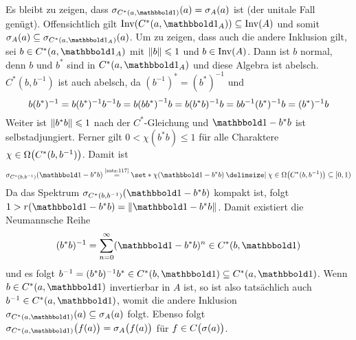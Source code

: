 \begin{beweis}
	Es bleibt zu zeigen, dass $\sigma_{C^*(a,\ind)}(a)= \sigma_A(a)$ ist (der unitale Fall genügt). 
	Offensichtlich gilt $\Inv \enbrace*{C^*(a,\ind_A)} \subseteq  \Inv(A)$ und somit $\sigma_A(a) \subseteq \sigma_{C^*(a,\ind_A)}(a)$. 
	Um zu zeigen, dass auch die andere Inklusion gilt, sei $b \in C^*(a,\ind_A)$ mit $\norm*{b}\le 1$ und $b \in \Inv(A)$.
	Dann ist $b$ normal, denn $b$ und $b^*$ sind in $C^*(a,\ind_A)$ und diese Algebra ist abelsch.
	$C^*(b,b^{-1})$ ist auch abelsch, da $(b^{-1})^* = (b^*)^{-1}$ und  
	\[
		b(b^*)^{-1} = b(b^*)^{-1} b^{-1} b = b \enbrace*{bb^*}^{-1} b = b(b^*b)^{-1}b = b b^{-1} (b^*)^{-1}b=(b^*)^{-1}b
	\]
	Weiter ist $\norm*{b^*b} \le 1$ nach der $C^*$-Gleichung und $\ind - b^*b$ ist selbstadjungiert. 
	Ferner gilt $0<\chi(b^*b) \le 1$ für alle Charaktere $\chi \in \Omega \enbrace*{C^*(b,b^{-1})}$. 
	Damit ist
	\[
		\sigma_{C^*(b,b^{-1})} \enbrace*{\ind - b^*b} \StackText{\ref{satz:117}}{=} \set*{\chi \enbrace*{\ind - b^*b} \given \chi \in \Omega \enbrace*{C^*(b,b^{-1})}} \subseteq 
		[0,1)
	\]
	Da das Spektrum $\sigma_{C^*(b,b^{-1})}(\ind-b^*b)$ kompakt ist, folgt $1 > r(\ind - b^*b)= \norm*{\ind -b^*b}$. Damit existiert die Neumannsche Reihe
	\[
		(b^*b)^{-1} = \sum_{n=0}^{\infty} (\ind-b^*b)^n \in C^*(b,\ind)
	\]
	und es folgt $b^{-1}=(b^*b)^{-1}b^* \in C^*(b,\ind) \subseteq C^*(a,\ind)$.
	Wenn $b \in C^*(a,\ind)$ invertierbar in $A$ ist, so ist also tatsächlich auch $b^{-1} \in C^*(a,\ind)$, womit die andere Inklusion $\sigma_{C^*(a,\ind)}(a) \subseteq \sigma_A(a)$ folgt. 
	Ebenso folgt $\sigma_{C^*(a,\ind)} \enbrace[\big]{f(a)}=\sigma_A \enbrace[\big]{f(a)}$ für $f \in C \enbrace[\big]{\sigma(a)}$.
\end{beweis}

